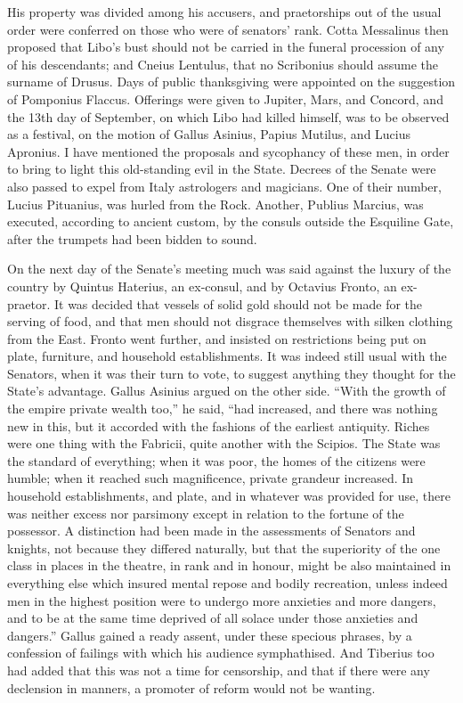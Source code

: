 His property was divided among his accusers, and praetorships out of the usual order were conferred on those who were of senators' rank. Cotta Messalinus then proposed that Libo's bust should not be carried in the funeral procession of any of his descendants; and Cneius Lentulus, that no Scribonius should assume the surname of Drusus. Days of public thanksgiving were appointed on the suggestion of Pomponius Flaccus. Offerings were given to Jupiter, Mars, and Concord, and the 13th day of September, on which Libo had killed himself, was to be observed as a festival, on the motion of Gallus Asinius, Papius Mutilus, and Lucius Apronius. I have mentioned the proposals and sycophancy of these men, in order to bring to light this old-standing evil in the State. Decrees of the Senate were also passed to expel from Italy astrologers and magicians. One of their number, Lucius Pituanius, was hurled from the Rock. Another, Publius Marcius, was executed, according to ancient custom, by the consuls outside the Esquiline Gate, after the trumpets had been bidden to sound.


On the next day of the Senate's meeting much was said against the luxury of the country by Quintus Haterius, an ex-consul, and by Octavius Fronto, an ex-praetor. It was decided that vessels of solid gold should not be made for the serving of food, and that men should not disgrace themselves with silken clothing from the East. Fronto went further, and insisted on restrictions being put on plate, furniture, and household establishments. It was indeed still usual with the Senators, when it was their turn to vote, to suggest anything they thought for the State's advantage. Gallus Asinius argued on the other side. ``With the growth of the empire private wealth too,'' he said, ``had increased, and there was nothing new in this, but it accorded with the fashions of the earliest antiquity. Riches were one thing with the Fabricii, quite another with the Scipios. The State was the standard of everything; when it was poor, the homes of the citizens were humble; when it reached such magnificence, private grandeur increased. In household establishments, and plate, and in whatever was provided for use, there was neither excess nor parsimony except in relation to the fortune of the possessor. A distinction had been made in the assessments of Senators and knights, not because they differed naturally, but that the superiority of the one class in places in the theatre, in rank and in honour, might be also maintained in everything else which insured mental repose and bodily recreation, unless indeed men in the highest position were to undergo more anxieties and more dangers, and to be at the same time deprived of all solace under those anxieties and dangers.'' Gallus gained a ready assent, under these specious phrases, by a confession of failings with which his audience symphathised. And Tiberius too had added that this was not a time for censorship, and that if there were any declension in manners, a promoter of reform would not be wanting.


